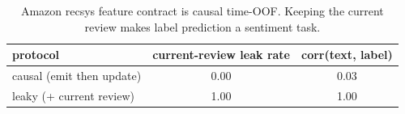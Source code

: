 \begin{table}[t]\centering
\caption{Amazon recsys feature contract is causal time-OOF. Keeping the current review makes label prediction a sentiment task.}
\label{tab:agod-recsys-features}
\begin{tabular}{lcc}\toprule
protocol & current-review leak rate & corr(text, label) \\
\midrule
causal (emit then update) & 0.00 & 0.03 \\
leaky (+ current review) & 1.00 & 1.00 \\
\bottomrule
\end{tabular}
\end{table}
